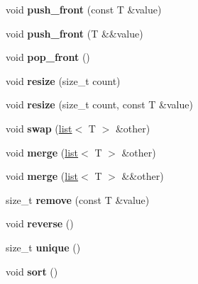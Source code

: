 \begin{DoxyCompactItemize}
void {\bfseries push\+\_\+front} (const T \&value)
\item 
\mbox{\label{classmystl_1_1list_af7d3ff89f7b0d8d44f370918985f8652}} 
void {\bfseries push\+\_\+front} (T \&\&value)
\item 
\mbox{\label{classmystl_1_1list_a55d54f27e8145eaf3fd257b3f11faaa9}} 
void {\bfseries pop\+\_\+front} ()
\item 
\mbox{\label{classmystl_1_1list_a959babc80fea14d8a845c6d8e6e05c11}} 
void {\bfseries resize} (size\+\_\+t count)
\item 
\mbox{\label{classmystl_1_1list_a1ce91e571c35a3d3f7792a3f1d49e7e8}} 
void {\bfseries resize} (size\+\_\+t count, const T \&value)
\item 
\mbox{\label{classmystl_1_1list_a2dae0160cd22c33ad05f812402a63da9}} 
void {\bfseries swap} (\hyperlink{classmystl_1_1list}{list}$<$ T $>$ \&other)
\item 
\mbox{\label{classmystl_1_1list_a58c4940ce027c8b9fe0c5d5e72021175}} 
void {\bfseries merge} (\hyperlink{classmystl_1_1list}{list}$<$ T $>$ \&other)
\item 
\mbox{\label{classmystl_1_1list_a6d1e9ff24ad995629b1cb609635786ac}} 
void {\bfseries merge} (\hyperlink{classmystl_1_1list}{list}$<$ T $>$ \&\&other)
\item 
\mbox{\label{classmystl_1_1list_a73eff81a7328fa3310927e42530e5a02}} 
size\+\_\+t {\bfseries remove} (const T \&value)
\item 
\mbox{\label{classmystl_1_1list_ac867a7d87ea5d7bafbb70fd430181f27}} 
void {\bfseries reverse} ()
\item 
\mbox{\label{classmystl_1_1list_af6534a7696a0afb4030eef5ab6233411}} 
size\+\_\+t {\bfseries unique} ()
\item 
\mbox{\label{classmystl_1_1list_a5387681d0e7373bf1d3ef2b269c9d41c}} 
void {\bfseries sort} ()

\end{DoxyCompactItemize}
